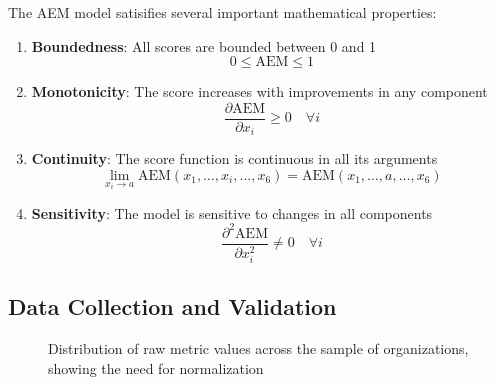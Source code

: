 \documentclass[12pt]{article}
\begin{document}
The AEM model satisifies several important mathematical properties:

\begin{enumerate}
    \item \textbf{Boundedness}: All scores are bounded between 0 and 1
    \begin{equation}
        0 \leq \text{AEM} \leq 1
    \end{equation}
    
    \item \textbf{Monotonicity}: The score increases with improvements in any component
    \begin{equation}
        \frac{\partial \text{AEM}}{\partial x_i} \geq 0 \quad \forall i
    \end{equation}
    
    \item \textbf{Continuity}: The score function is continuous in all its arguments
    \begin{equation}
        \lim_{x_i \to a} \text{AEM}(x_1, \ldots, x_i, \ldots, x_6) = \text{AEM}(x_1, \ldots, a, \ldots, x_6)
    \end{equation}
    
    \item \textbf{Sensitivity}: The model is sensitive to changes in all components
    \begin{equation}
        \frac{\partial^2 \text{AEM}}{\partial x_i^2} \neq 0 \quad \forall i
    \end{equation}
\end{enumerate}

\subsection{Data Collection and Validation}

\begin{figure}[H]
\centering
{}
\caption{Distribution of raw metric values across the sample of organizations, showing the need for normalization}
\label{fig:raw_distribution}
\end{figure}
\end{document}
